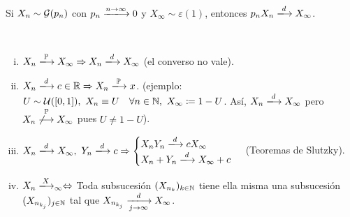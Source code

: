 \begin{eg}
	Si $X_{n} \sim \mathcal{G}(p_{n})$ con $p_{n} \xlongrightarrow{n \to \infty} 0$ y $X_{\infty} \sim \varepsilon(1)$, entonces $p_{n} X_{n} \xlongrightarrow{d} X_{\infty}$.
\end{eg}

\begin{property}~
	\begin{enumerate}[i)]
		\item $X_{n} \xlongrightarrow{\mbb{P}} X_{\infty} \implies X_{n} \xlongrightarrow{d} X_{\infty}$ (el converso no vale).

		\item $X_{n} \xlongrightarrow{d} c \in \R \implies X_{n} \xlongrightarrow{\mbb{P}} x$. (ejemplo: $U \sim \mathcal{U}([0,1]),\ X_{n} \equiv U \quad \forall n \in \mathbb{N},\ X_{\infty} \coloneq 1 - U$. Así, $X_{n} \xlongrightarrow{d} X_{\infty}$ pero $X_{n} \stackrel{\mathbb{P}}{\not\longrightarrow} X_{\infty}$ pues $U \neq 1 - U$).

		\item $X_{n} \xlongrightarrow{d} X_{\infty},\ Y_{n} \xlongrightarrow{d} c \implies \begin{cases}
			X_{n} Y_{n} \xlongrightarrow{d} c X_{\infty} \\
			X_{n} + Y_{n} \xlongrightarrow{d} X_{\infty} + c
		\end{cases}$ (Teoremas de Slutzky).

		\item $X_{n} \xlongrightarrow X_{\infty} \iff$ Toda subsucesión $(X_{n_{k}})_{k \in \mathbb{N}}$ tiene ella misma una subsucesión $(X_{n_{k_{j}}})_{j \in \mathbb{N}}$ tal que $X_{n_{k_{j}}} \xlongrightarrow[j \to \infty]{d} X_{\infty}$.
	\end{enumerate}
\end{property}


